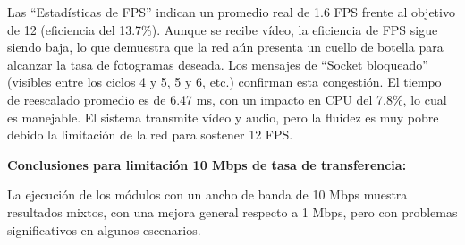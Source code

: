 Las ``Estadísticas de FPS'' indican un promedio real de 1.6 FPS frente al objetivo de 12 (eficiencia del 13.7\%). Aunque se recibe vídeo, la eficiencia de FPS sigue siendo baja, lo que demuestra que la red aún presenta un cuello de botella para alcanzar la tasa de fotogramas deseada. Los mensajes de ``Socket bloqueado'' (visibles entre los ciclos 4 y 5, 5 y 6, etc.) confirman esta congestión. El tiempo de reescalado promedio es de 6.47 ms, con un impacto en CPU del 7.8\%, lo cual es manejable. El sistema transmite vídeo y audio, pero la fluidez es muy pobre debido la limitación de la red para sostener 12 FPS.
\vspace{\baselineskip}

\textbf{Conclusiones para limitación 10 Mbps de tasa de transferencia:}

La ejecución de los módulos con un ancho de banda de 10 Mbps muestra resultados mixtos, con una mejora general respecto a 1 Mbps, pero con problemas significativos en algunos escenarios.
